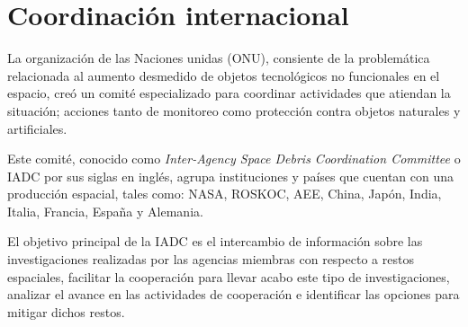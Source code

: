 \section*{Coordinación internacional} \label{sec:coordinacion}

La organización de las Naciones unidas (ONU), consiente de la problemática relacionada al aumento desmedido de objetos tecnológicos no funcionales en el espacio, creó un comité especializado para coordinar actividades que atiendan la situación;
acciones tanto de monitoreo como protección contra objetos naturales y artificiales.

Este comité, conocido como  \textit{Inter-Agency Space Debris Coordination Committee} o IADC por sus siglas en inglés, agrupa instituciones y países que cuentan con una producción espacial, tales como: NASA, ROSKOC, AEE, China, Japón, India, Italia, Francia, España y Alemania.

El objetivo principal de la IADC \citep{iadc} es el intercambio de información sobre las investigaciones realizadas por las agencias miembras con respecto a restos espaciales,
facilitar la cooperación para llevar acabo este tipo de investigaciones, 
analizar el avance en las actividades de cooperación 
e identificar las opciones para mitigar dichos restos.

